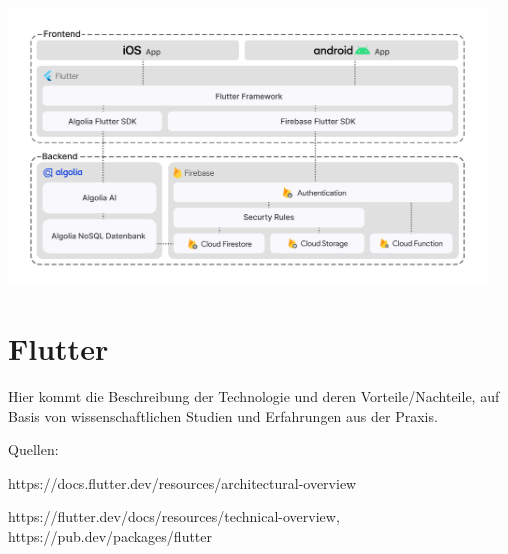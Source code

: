 

\begin{center}
    \includegraphics[width=0.95\textwidth]{pics/systemarchitektur_diagram.png}
\end{center}

% 


\section{Flutter}

Hier kommt die Beschreibung der Technologie und deren Vorteile/Nachteile, auf Basis von wissenschaftlichen Studien und Erfahrungen aus der Praxis.

Quellen:

https://docs.flutter.dev/resources/architectural-overview

https://flutter.dev/docs/resources/technical-overview,
https://pub.dev/packages/flutter







